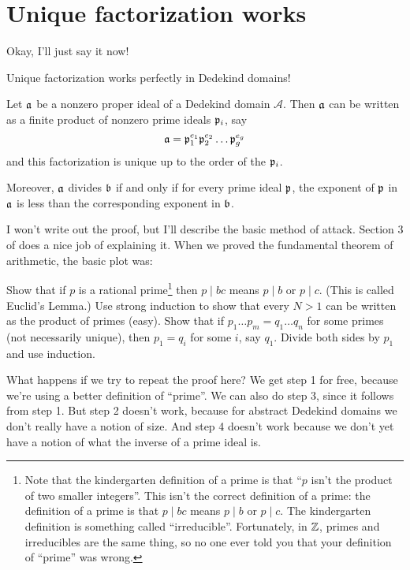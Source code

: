 \section{Unique factorization works}
Okay, I'll just say it now!
\begin{moral}
	Unique factorization works perfectly in Dedekind domains!
\end{moral}
\begin{theorem}
	Let $\aa$ be a nonzero proper ideal of a Dedekind domain $\mathcal A$.
	Then $\aa$ can be written as a finite product of nonzero prime ideals $\pp_i$, say
	\[ \aa = \pp_1^{e_1} \pp_2^{e_2} \dots \pp_g^{e_g} \]
	and this factorization is unique up to the order of the $\pp_i$.

	Moreover, $\aa$ divides $\bb$ if and only if for every prime ideal $\pp$,
	the exponent of $\pp$ in $\aa$ is less than the corresponding exponent in $\bb$.
\end{theorem}

I won't write out the proof, but I'll describe the basic method of attack.
Section 3 of \cite{ref:ullery} does a nice job of explaining it.
When we proved the fundamental theorem of arithmetic, the basic plot was:
\begin{enumerate}[(1)]
	\ii Show that if $p$ is a rational prime\footnote{
		Note that the kindergarten definition of a prime is
		that ``$p$ isn't the product of two smaller integers''.
		This isn't the correct definition of a prime:
		the definition of a prime is that $p \mid bc$
		means $p \mid b$ or $p \mid c$.
		The kindergarten definition is something called ``irreducible''.
		Fortunately, in $\ZZ$, primes and irreducibles are the same thing,
		so no one ever told you that your definition of ``prime'' was wrong.}
	then $p \mid bc$ means $p \mid b$ or $p \mid c$.  (This is called Euclid's Lemma.)
	\ii Use strong induction to show that every $N > 1$ can be written as the product of primes (easy).
	\ii Show that if $p_1 \dots p_m = q_1 \dots q_n$ for some primes (not necessarily unique),
	then $p_1 = q_i$ for some $i$, say $q_1$.
	\ii Divide both sides by $p_1$ and use induction.
\end{enumerate}
What happens if we try to repeat the proof here?
We get step 1 for free, because we're using a better definition of ``prime''.
We can also do step 3, since it follows from step 1.
But step 2 doesn't work, because for abstract Dedekind domains we don't really have a notion of size.
And step 4 doesn't work because we don't yet have a notion of what the inverse of a prime ideal is.

